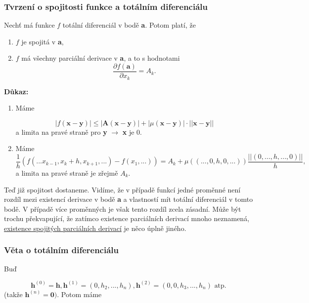 \documentclass[../main.tex]{subfiles}
\begin{document}
\subsubsection{Tvrzení o spojitosti funkce a totálním diferenciálu}
\hspace{1.2mm}
Nechť má funkce $f$ totální diferenciál v bodě \textbf{a}. Potom platí, že 
\begin{enumerate}
    \item $f$ je spojitá v \textbf{a},
    \item $f$ má všechny parciální derivace v \textbf{a}, a to s hodnotami 
    \[\frac{\partial f(\textbf{a})}{\partial x_k} = A_k.\]
\end{enumerate}
\textbf{Důkaz:}
\begin{enumerate}
    \item Máme
    
    \[|f(\textbf{x}-\textbf{y})| \leq |\textbf{A}(\textbf{x}-\textbf{y})| + |\mu(\textbf{x}-\textbf{y})|\cdot||\textbf{x}-\textbf{y}||\]
    a limita na pravé straně pro \textbf{y} $\rightarrow$ \textbf{x} je 0.
    
    \item Máme 
    \[\frac{1}{h}(f(...x_{k-1},x_k+h,x_{k+1},...) - f(x_1,...)) = A_k + \mu((...,0,h,0,...))\frac{||(0,...,h,...,0)||}{h},\]
    a limita na pravé straně je zřejmě $A_k$.
    
\end{enumerate}


    \noindent
    \hspace{1.2mm}
    Teď již spojitost dostaneme. Vidíme, že v případě funkcí jedné proměnné není rozdíl mezi existencí derivace v bodě \textbf{a} a vlastností
    mít totální diferenciál v tomto bodě. V případě více proměnných je však tento rozdíl zcela zásadní. Může být trochu překvapující, že 
    zatímco existence parciálních derivací mnoho neznamená, \underline{existence spojitých parciálních derivací} je něco úplně jiného.

\subsubsection{Věta o totálním diferenciálu}
\hspace{1.2mm}
Buď

\[\textbf{h}^{(0)} = \textbf{h}, \textbf{h}^{(1)} = (0, h_2,...,h_n), \textbf{h}^{(2)} = (0,0,h_3,...,h_n) \textrm{ atp.} \]
(takže $\textbf{h}^{(n)} = \textbf{0})$. Potom máme
\end{document}
